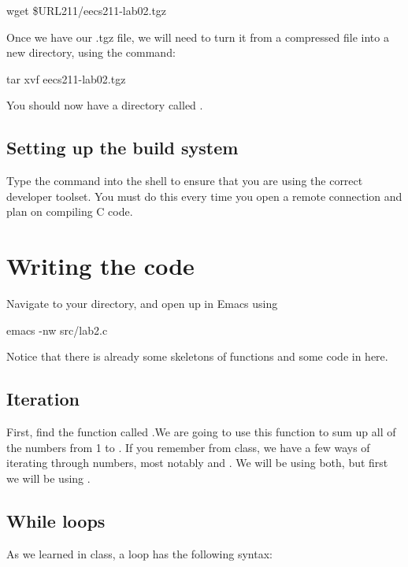 \documentclass{tufte-handout}
\def\ThisLabBase{eecs211-lab02}
\begin{document}
\begin{CmdLine}
  \prompt wget \$URL211/\ThisLabBase.tgz
\end{CmdLine}

Once we have our .tgz file, we will need to turn it from a compressed
file into a new directory, using the  command:

\begin{CmdLine}
  \prompt tar xvf \ThisLabBase.tgz
\end{CmdLine}

You should now have a directory called \filename{\ThisLabBase}.

\subsection{Setting up the build system}
Type the  command into the shell to ensure that you are
using the correct developer toolset. You must do this every time you
open a remote connection and plan on compiling C code.

\section{Writing the code}
Navigate to your \filename{\LabBaseUrl} directory, and open up
 in Emacs using 
\begin{CmdLine}
  \prompt emacs -nw src/lab2.c
\end{CmdLine}
Notice that there is already some skeletons of functions and some code in  here.

\subsection{Iteration}
First, find the function called .We are going to use this function to sum up all of the numbers from 1 to .  If you remember from class, we have a few ways of iterating through numbers, most notably  and .  We will be using both, but first we will be using .

\subsection{While loops}
As we learned in class, a   loop has the following
syntax:
\end{document}
